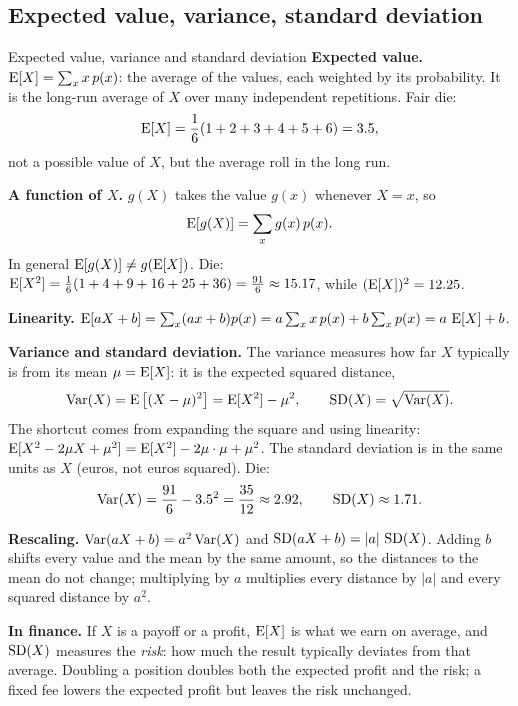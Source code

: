 
\subsection*{Expected value, variance, standard deviation}

\begin{key}{Expected value, variance and standard deviation}
	\setlength{\parskip}{5pt}
	\textbf{Expected value.} $\operatorname{E}[X]=\sum_x x\,p(x)$: the average of the
	values, each weighted by its probability. It is the long-run average of
	$X$ over many independent repetitions. Fair die:
	\[ \operatorname{E}[X]=\frac16(1+2+3+4+5+6)=3.5, \]
	not a possible value of $X$, but the average roll in the long run.

	\textbf{A function of $X$.} $g(X)$ takes the value $g(x)$ whenever $X=x$,
	so
	\[ \operatorname{E}[g(X)]=\sum_x g(x)\,p(x). \]
	In general $\operatorname{E}[g(X)]\ne g(\operatorname{E}[X])$. Die:
	$\operatorname{E}[X^2]=\frac16(1+4+9+16+25+36)=\frac{91}{6}\approx15.17$, while
	$(\operatorname{E}[X])^2=12.25$.

	\textbf{Linearity.} $\operatorname{E}[aX+b]=\sum_x(ax+b)p(x)=a\sum_x x\,p(x)+b\sum_x
		p(x)=a\,\operatorname{E}[X]+b$.

	\textbf{Variance and standard deviation.} The variance measures how far
	$X$ typically is from its mean $\mu=\operatorname{E}[X]$: it is the expected squared
	distance,
	\[ \operatorname{Var}(X)=\operatorname{E}\big[(X-\mu)^2\big]=\operatorname{E}[X^2]-\mu^2,\qquad
		\operatorname{SD}(X)=\sqrt{\operatorname{Var}(X)}. \]
	The shortcut comes from expanding the square and using linearity:
	$\operatorname{E}[X^2-2\mu X+\mu^2]=\operatorname{E}[X^2]-2\mu\cdot\mu+\mu^2$. The standard deviation
	is in the same units as $X$ (euros, not euros squared). Die:
	\[ \operatorname{Var}(X)=\frac{91}{6}-3.5^2=\frac{35}{12}\approx2.92,\qquad
		\operatorname{SD}(X)\approx1.71. \]

	\textbf{Rescaling.} $\operatorname{Var}(aX+b)=a^2\operatorname{Var}(X)$ and $\operatorname{SD}(aX+b)=|a|\,\operatorname{SD}(X)$.
	Adding $b$ shifts every value and the mean by the same amount, so the
	distances to the mean do not change; multiplying by $a$ multiplies every
	distance by $|a|$ and every squared distance by $a^2$.

	\textbf{In finance.} If $X$ is a payoff or a profit, $\operatorname{E}[X]$ is what we
	earn on average, and $\operatorname{SD}(X)$ measures the \emph{risk}: how much the
	result typically deviates from that average. Doubling a position doubles
	both the expected profit and the risk; a fixed fee lowers the expected
	profit but leaves the risk unchanged.
\end{key}


